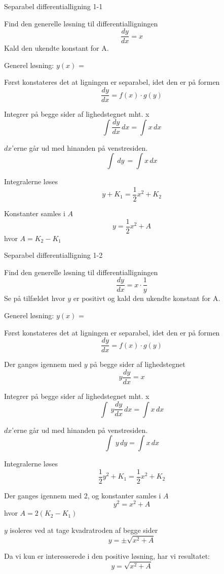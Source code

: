\documentclass{article}
\begin{document}
\tableofcontents
\newpage

\begin{exercise}{Separabel differentialligning 1-1}


Find den generelle løsning til differentialligningen
\[
\frac{dy}{dx} = x
\]
Kald den ukendte konstant for A.

Generel løsning: $y(x)$ = 

\hint

Først konstateres det at ligningen er separabel, idet den er på formen
\[
\frac{dy}{dx} = f(x) \cdot g(y)
\]


\hint

Integrer på begge sider af lighedstegnet mht. x
\[
\int\frac{dy}{dx}\, dx= \int x\,dx
\]

\hint

$dx$'erne går ud med hinanden på venstresiden.
\[
\int\ dy\,= \int x\,dx
\]

\hint

Integralerne løses
\[
y + K_1 = \frac{1}{2} x^2 + K_2
\]


\hint

Konstanter samles i $A$
\[
y = \frac{1}{2}x^2 + A
\]
hvor $A=K_2 - K_1$

\end{exercise}


\newpage

\begin{exercise}{Separabel differentialligning 1-2}


Find den generelle løsning til differentialligningen
\[
\frac{dy}{dx} = x \cdot \frac{1}{y}
\]
Se på tilfældet hvor $y$ er positivt og kald den ukendte konstant for A.

Generel løsning: $y(x)$ = 

\hint

Først konstateres det at ligningen er separabel, idet den er på formen
\[
\frac{dy}{dx} = f(x) \cdot g(y)
\]

\hint
Der ganges igennem med $y$ på begge sider af lighedstegnet
\[
y \frac{dy}{dx} = x
\]

\hint

Integrer på begge sider af lighedstegnet mht. x
\[
\int\ y \frac{dy}{dx}\, dx= \int x\,dx
\]

\hint

$dx$'erne går ud med hinanden på venstresiden.
\[
\int\ y \, dy= \int x\,dx
\]

\hint

Integralerne løses
\[
\frac{1}{2} y^2 + K_1 = \frac{1}{2} x^2 + K_2
\]


\hint

Der ganges igennem med 2, og konstanter samles i $A$
\[
y^2 = x^2 + A
\]
hvor $A=2(K_2 - K_1)$

\hint

$y$ isoleres ved at tage kvadratroden af begge sider
\[
y = \pm \sqrt{x^2 + A}
\]

\hint

Da vi kun er interesserede i den positive løsning, har vi resultatet:
\[
y = \sqrt{x^2 + A}
\]

\end{exercise}
\end{document}
